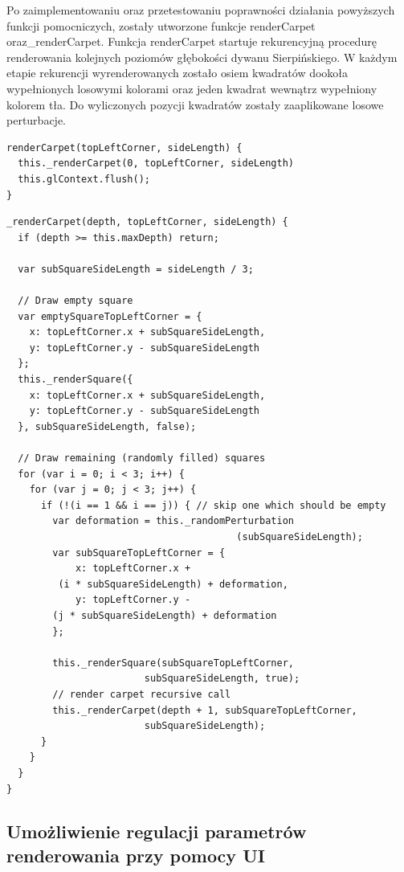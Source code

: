 \documentclass[a4paper,11pt]{article}
\begin{document}
Po zaimplementowaniu oraz przetestowaniu poprawności działania powyższych funkcji pomocniczych, zostały utworzone funkcje renderCarpet  oraz_renderCarpet. Funkcja renderCarpet startuje rekurencyjną procedurę renderowania kolejnych poziomów głębokości dywanu Sierpińskiego. W każdym etapie rekurencji wyrenderowanych zostało osiem kwadratów dookoła wypełnionych losowymi kolorami oraz jeden kwadrat wewnątrz wypełniony kolorem tła. Do wyliczonych pozycji kwadratów zostały zaaplikowane losowe perturbacje.

\begin{lstlisting}[caption=Definicja funkcji renderCarpet]
renderCarpet(topLeftCorner, sideLength) {
  this._renderCarpet(0, topLeftCorner, sideLength)
  this.glContext.flush();
}
\end{lstlisting}

\begin{lstlisting}[caption=Definicja funkcji rekurencyjnej _renderCarpet]
_renderCarpet(depth, topLeftCorner, sideLength) {
  if (depth >= this.maxDepth) return;

  var subSquareSideLength = sideLength / 3;

  // Draw empty square
  var emptySquareTopLeftCorner = {
    x: topLeftCorner.x + subSquareSideLength,
    y: topLeftCorner.y - subSquareSideLength
  };
  this._renderSquare({
    x: topLeftCorner.x + subSquareSideLength,
    y: topLeftCorner.y - subSquareSideLength
  }, subSquareSideLength, false);

  // Draw remaining (randomly filled) squares
  for (var i = 0; i < 3; i++) {
    for (var j = 0; j < 3; j++) {
      if (!(i == 1 && i == j)) { // skip one which should be empty
        var deformation = this._randomPerturbation
										(subSquareSideLength);
        var subSquareTopLeftCorner = {
          	x: topLeftCorner.x +
		 (i * subSquareSideLength) + deformation,
			y: topLeftCorner.y - 
		(j * subSquareSideLength) + deformation
        };

        this._renderSquare(subSquareTopLeftCorner, 
						subSquareSideLength, true);
        // render carpet recursive call
        this._renderCarpet(depth + 1, subSquareTopLeftCorner, 
						subSquareSideLength);
      }
    }
  }
}
\end{lstlisting}

\subsection{Umożliwienie regulacji parametrów renderowania przy pomocy UI}
\end{document}
